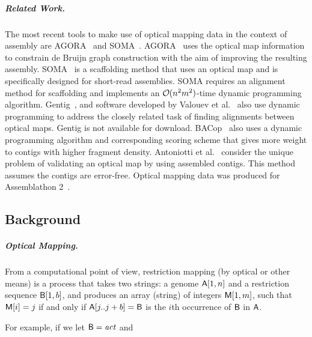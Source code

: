 \subparagraph{Related Work.}
The most recent tools to make use of optical mapping data in the context of assembly are AGORA~\cite{agora} and SOMA~\cite{Nagarajan08}. AGORA~\cite{agora} uses the optical map information to constrain de Bruijn graph construction with the aim of improving the resulting assembly. SOMA~\cite{Nagarajan08} is a scaffolding method that uses an optical map and is specifically designed for short-read assemblies. SOMA requires an alignment method for scaffolding and implements an $\bigO(n^2 m^2)$-time dynamic programming algorithm. Gentig~\cite{Anantharaman01}, and software developed by Valouev et al.~\cite{Valouev06} also use dynamic programming to address the closely related task of finding alignments between optical maps. Gentig is not available for download.  BACop~\cite{Zhou09} also uses a dynamic programming algorithm and corresponding scoring scheme that gives more weight to contigs with higher fragment density. Antoniotti et al.~\cite{antoniotti} consider the unique problem of validating an optical map by using assembled contigs. This method assumes the contigs are error-free. Optical mapping data was produced for Assemblathon 2~\cite{bradnam2013assemblathon}.















\subsection{Background}
\label{sec-background-twin}


\subparagraph{Optical Mapping.}
From a computational point of view, restriction mapping (by optical or other means) is a process that takes two
strings: a genome $\mathsf{A}[1,n]$ and a restriction sequence $\mathsf{B}[1,b]$, and produces
an array (string) of integers $\mbox{\rm {\sf M}}[1,m]$, such that $\mbox{\rm {\sf M}}[i] = j$ if and only if
$\mathsf{A}[j..j+b] = \mathsf{B}$ is the $i$th occurrence of $\mathsf{B}$ in $\mathsf{A}$.

For example, if we let $\mathsf{B} = \mbox{\emph{act}}$ and
\begin{center}
\end{center}

